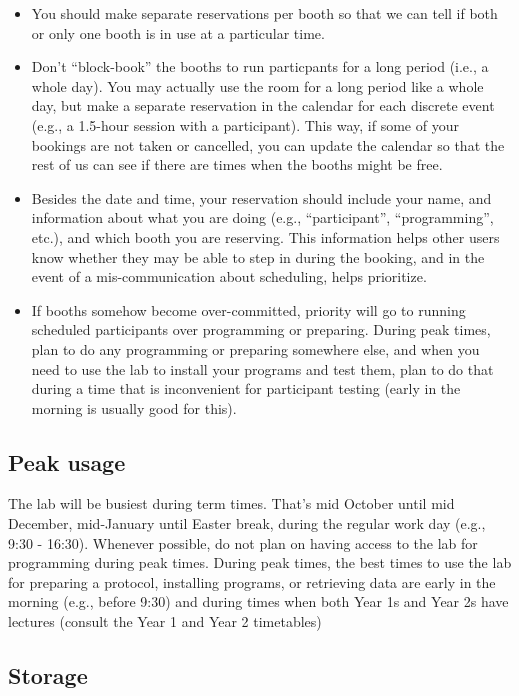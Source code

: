 \documentclass[
  12pt,
]{book}
\begin{document}
\begin{itemize}
\item
  You should make separate reservations per booth so that we can tell if both or only one booth is in use at a particular time.
\item
  Don't ``block-book'' the booths to run particpants for a long period (i.e., a whole day). You may actually use the room for a long period like a whole day, but make a separate reservation in the calendar for each discrete event (e.g., a 1.5-hour session with a participant). This way, if some of your bookings are not taken or cancelled, you can update the calendar so that the rest of us can see if there are times when the booths might be free.
\item
  Besides the date and time, your reservation should include your name, and information about what you are doing (e.g., ``participant'', ``programming'', etc.), and which booth you are reserving. This information helps other users know whether they may be able to step in during the booking, and in the event of a mis-communication about scheduling, helps prioritize.
\item
  If booths somehow become over-committed, priority will go to running scheduled participants over programming or preparing. During peak times, plan to do any programming or preparing somewhere else, and when you need to use the lab to install your programs and test them, plan to do that during a time that is inconvenient for participant testing (early in the morning is usually good for this).
\end{itemize}

\subsection{Peak usage}\label{peak-usage}

The lab will be busiest during term times. That's mid October until mid December, mid-January until Easter break, during the regular work day (e.g., 9:30 - 16:30). Whenever possible, do not plan on having access to the lab for programming during peak times. During peak times, the best times to use the lab for preparing a protocol, installing programs, or retrieving data are early in the morning (e.g., before 9:30) and during times when both Year 1s and Year 2s have lectures (consult the Year 1 and Year 2 timetables)

\subsection{Storage}\label{storage}
\end{document}
